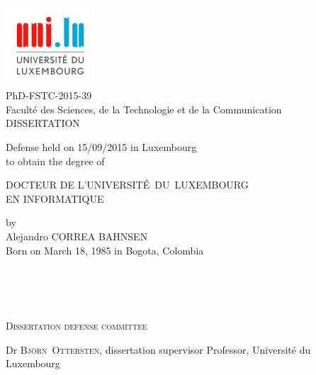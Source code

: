 
\begin{titlepage}
\begin{addmargin}[-1cm]{-1cm}
    \begin{center}
        \includegraphics[width=0.25\textwidth]{figures/logo_unilu}\\
        PhD-FSTC-2015-39\\
        Facult\'{e} des Sciences, de la Technologie et de la Communication \\ \vskip0.75cm
	{\Large \textsc{DISSERTATION}} \\ \vskip0.5cm

        Defense held on 15/09/2015 in Luxembourg\\ \vskip0.1cm
        to obtain the degree of \\ \vskip0.7cm
        
        {\Large \textsc{DOCTEUR DE L'UNIVERSIT\'{E}~DU~LUXEMBOURG}}\\ \vskip0.25cm
        {\Large \textsc{EN INFORMATIQUE}}\\ \vskip0.4cm
        
        by \\ \vskip0.4cm
        {\large Alejandro CORREA BAHNSEN} \\
        {\small Born on March 18, 1985 in Bogota, Colombia} \\ \vskip1.25cm
        
        {\Large {}} \\ \bigskip
        {\Large {}}\\
        {\Large {}} \\ \vskip1.25cm
    \end{center}
    
    {\Large \noindent \textsc{Dissertation defense committee}} \\ \vskip-0.15cm
          
\normalsize \noindent Dr \textsc{Bj\"orn~Ottersten}, dissertation supervisor \newline
\small Professor, Universit\'{e} du Luxembourg\\ \vskip-0.3cm


\end{addmargin}
\end{titlepage}
